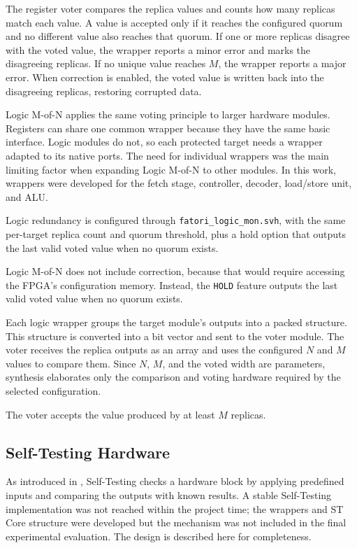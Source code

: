 The register voter compares the replica values and counts how many replicas match each value. A value is accepted only if it reaches the configured quorum and no different value also reaches that quorum. If one or more replicas disagree with the voted value, the wrapper reports a minor error and marks the disagreeing replicas. If no unique value reaches \(M\), the wrapper reports a major error. When correction is enabled, the voted value is written back into the disagreeing replicas, restoring corrupted data.

Logic M-of-N applies the same voting principle to larger hardware modules. Registers can share one common wrapper because they have the same basic interface. Logic modules do not, so each protected target needs a wrapper adapted to its native ports. The need for individual wrappers was the main limiting factor when expanding Logic M-of-N to other modules. In this work, wrappers were developed for the fetch stage, controller, decoder, load/store unit, and \ac{ALU}.

Logic redundancy is configured through \texttt{fatori\_logic\_mon.svh}, with the same per-target replica count and quorum threshold, plus a hold option that outputs the last valid voted value when no quorum exists.

Logic M-of-N does not include correction, because that would require accessing the \ac{FPGA}'s configuration memory. Instead, the \texttt{HOLD} feature outputs the last valid voted value when no quorum exists.

Each logic wrapper groups the target module's outputs into a packed structure. This structure is converted into a bit vector and sent to the voter module. The voter receives the replica outputs as an array and uses the configured \(N\) and \(M\) values to compare them. Since \(N\), \(M\), and the voted width are parameters, synthesis elaborates only the comparison and voting hardware required by the selected configuration.

The voter accepts the value produced by at least \(M\) replicas.



\subsection{Self-Testing Hardware}
\label{chap6:self_test}

As introduced in , Self-Testing checks a hardware block by applying predefined inputs and comparing the outputs with known results. A stable Self-Testing implementation was not reached within the project time; the wrappers and \ac{ST} Core structure were developed but the mechanism was not included in the final experimental evaluation. The design is described here for completeness.


